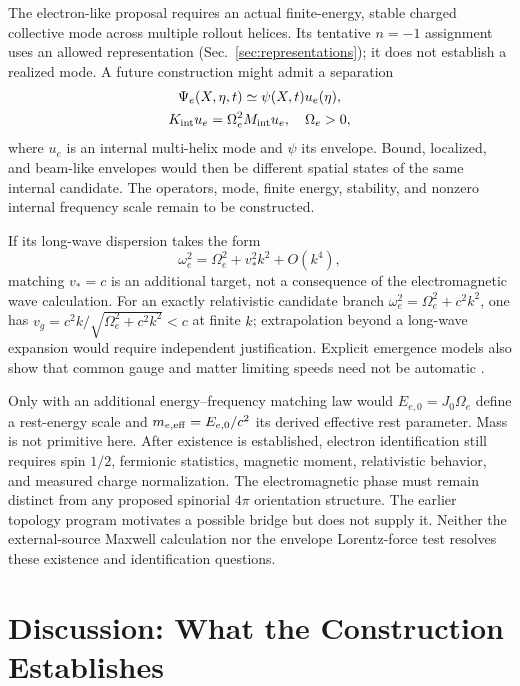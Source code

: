 \documentclass[11pt]{article}
\begin{document}
The electron-like proposal requires an actual finite-energy, stable charged collective mode across multiple rollout helices. Its tentative $n=-1$ assignment uses an allowed representation (Sec.~\ref{sec:representations}); it does not establish a realized mode. A future construction might admit a separation
\begin{equation}
\begin{gathered}
\Psi_e(X,\eta,t)\simeq\psi(X,t)u_e(\eta),\\
K_{\rm int}u_e=\Omega_e^2M_{\rm int}u_e,\quad \Omega_e>0,
\end{gathered}
\end{equation}
where $u_e$ is an internal multi-helix mode and $\psi$ its envelope. Bound, localized, and beam-like envelopes would then be different spatial states of the same internal candidate. The operators, mode, finite energy, stability, and nonzero internal frequency scale remain to be constructed.

If its long-wave dispersion takes the form
\begin{equation}
\omega_e^2=\Omega_e^2+v_*^2k^2+O(k^4),
\end{equation}
matching $v_*=c$ is an additional target, not a consequence of the electromagnetic wave calculation. For an exactly relativistic candidate branch $\omega_e^2=\Omega_e^2+c^2k^2$, one has $v_g=c^2k/\sqrt{\Omega_e^2+c^2k^2}<c$ at finite $k$; extrapolation beyond a long-wave expansion would require independent justification. Explicit emergence models also show that common gauge and matter limiting speeds need not be automatic \cite{levinwen2006}.

Only with an additional energy--frequency matching law would $E_{e,0}=J_0\Omega_e$ define a rest-energy scale and $m_{e,\rm eff}=E_{e,0}/c^2$ its derived effective rest parameter. Mass is not primitive here. After existence is established, electron identification still requires spin $1/2$, fermionic statistics, magnetic moment, relativistic behavior, and measured charge normalization. The electromagnetic phase must remain distinct from any proposed spinorial $4\pi$ orientation structure. The earlier topology program motivates a possible bridge but does not supply it. Neither the external-source Maxwell calculation nor the envelope Lorentz-force test resolves these existence and identification questions.

\section{Discussion: What the Construction Establishes}
\end{document}
